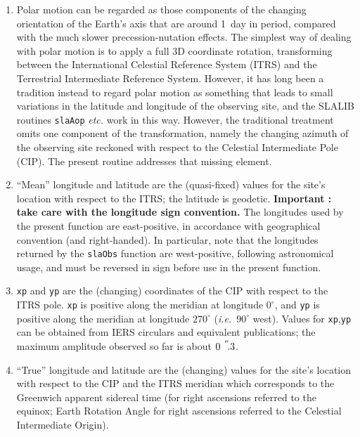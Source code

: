 \documentclass[11pt,fleqn,twoside]{article}
\renewcommand{\_}{{\tt\char'137}}     %
\newcommand{\arcseci}[1] {$#1\hspace{0.05em}$\raisebox{-0.5ex}
                         {$^{'\hspace{-0.1em}'\hspace{0.0em}}$}}
\newcommand{\arcsec}[2] {\arcseci{#1}$\hspace{-0.35em}.#2$}
\begin{document}
{
\begin{enumerate}
\item Polar motion can be regarded as those components of the
      changing orientation of the Earth's axis that are around 1~day
      in period, compared with the much slower precession-nutation
      effects.  The simplest way of dealing with polar motion is to apply
      a full 3D coordinate rotation, transforming
      between the International Celestial
      Reference System (ITRS) and the Terrestrial Intermediate Reference
      System.  However, it has long been a tradition instead to regard
      polar motion as something that leads to small variations
      in the latitude and
      longitude of the observing site, and the SLALIB routines
      {\tt slaAop} {\it etc.}\/ work in this way.  However, the traditional
      treatment omits one component of the transformation, namely the
      changing azimuth of the observing site reckoned with respect
      to the Celestial Intermediate Pole (CIP).  The present routine
      addresses that missing element.
\item ``Mean'' longitude and latitude are the (quasi-fixed) values for the
      site's location with respect to the ITRS;
      the latitude is geodetic.
      {\bf Important : take care with the longitude sign convention.}
      The longitudes used by the present function
      are east-positive, in accordance with geographical convention
      (and right-handed).  In particular, note that the longitudes
      returned by the {\tt slaObs} function are west-positive, following
      astronomical usage, and must be reversed in sign before use in
      the present function.
\item {\tt xp} and {\tt yp} are the (changing)
      coordinates of the CIP with respect to the ITRS pole.
      {\tt xp} is positive along the meridian at longitude $0^\circ$,
      and {\tt yp} is positive along the meridian at longitude
      $270^\circ$ ({\it i.e.}~$90^\circ$ west).  Values for
      {\tt xp},{\tt yp} can
      be obtained from IERS circulars and equivalent publications;
      the maximum amplitude observed so far is about \arcsec{0}{3}.
\item ``True'' longitude and latitude are the (changing) values for
      the site's location with respect to the CIP
      and the ITRS meridian which corresponds to the Greenwich
      apparent sidereal time (for right ascensions referred to the
      equinox; Earth Rotation Angle for right ascensions
      referred to the Celestial Intermediate Origin).

\end{enumerate}}
\end{document}
